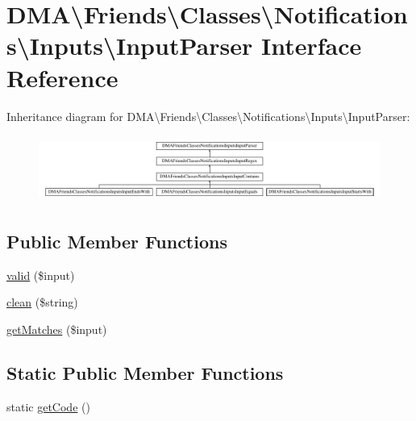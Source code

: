 \hypertarget{interfaceDMA_1_1Friends_1_1Classes_1_1Notifications_1_1Inputs_1_1InputParser}{\section{D\-M\-A\textbackslash{}Friends\textbackslash{}Classes\textbackslash{}Notifications\textbackslash{}Inputs\textbackslash{}Input\-Parser Interface Reference}
\label{interfaceDMA_1_1Friends_1_1Classes_1_1Notifications_1_1Inputs_1_1InputParser}
}
Inheritance diagram for D\-M\-A\textbackslash{}Friends\textbackslash{}Classes\textbackslash{}Notifications\textbackslash{}Inputs\textbackslash{}Input\-Parser\-:\begin{figure}[H]
\begin{center}
\leavevmode
\includegraphics[height=2.189638cm]{d5/d9c/interfaceDMA_1_1Friends_1_1Classes_1_1Notifications_1_1Inputs_1_1InputParser}
\end{center}
\end{figure}
\subsection*{Public Member Functions}
\begin{DoxyCompactItemize}
\item 
\hyperlink{interfaceDMA_1_1Friends_1_1Classes_1_1Notifications_1_1Inputs_1_1InputParser_aff740c6a54419e9e04f699554ed26267}{valid} (\$input)
\item 
\hyperlink{interfaceDMA_1_1Friends_1_1Classes_1_1Notifications_1_1Inputs_1_1InputParser_ae55bc02284a0a2a68d576847ccbd0dc4}{clean} (\$string)
\item 
\hyperlink{interfaceDMA_1_1Friends_1_1Classes_1_1Notifications_1_1Inputs_1_1InputParser_ae7f03d911b0981b8557aa35dd5ea5b55}{get\-Matches} (\$input)
\end{DoxyCompactItemize}
\subsection*{Static Public Member Functions}
\begin{DoxyCompactItemize}
\item 
static \hyperlink{interfaceDMA_1_1Friends_1_1Classes_1_1Notifications_1_1Inputs_1_1InputParser_adaefcdcdfd7a28cad4f7418112243cd2}{get\-Code} ()
\end{DoxyCompactItemize}



